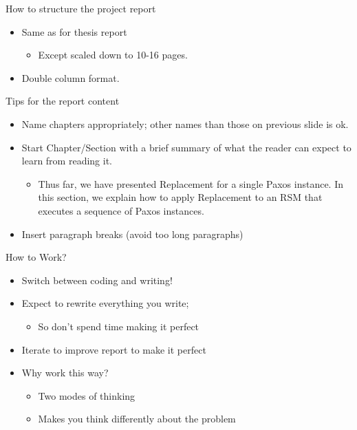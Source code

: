\documentclass[hyperref={pdfpagelabels=false}, aspectratio=1610]{beamer}
\begin{document}
\begin{frame}
\begin{block}{How to structure the project report}
 \begin{itemize}
	\item Same as for thesis report
	\begin{itemize}
		\item Except scaled down to 10-16 pages.
	\end{itemize}
	\item Double column format.
 \end{itemize}
\end{block}
\end{frame}


\begin{frame}
\begin{block}{Tips for the report content}
 \begin{itemize}
  \item Name chapters appropriately; other names than those on previous slide is ok.
  \item Start Chapter/Section with a brief summary of what the reader can expect to learn from reading it.
  \begin{itemize}
   \item Thus far, we have presented Replacement for a single Paxos instance. In this section, we explain how to apply Replacement to an RSM that executes a sequence of Paxos instances.
  \end{itemize}
  \item Insert paragraph breaks (avoid too long paragraphs)
 \end{itemize}
\end{block}
\end{frame}


\begin{frame}
\begin{block}{How to Work?}
 \begin{itemize}
  \item<2-> Switch between coding and writing!
  \item<3-> Expect to rewrite everything you write; 
  \begin{itemize}
  	\item<3-> So don't spend time making it perfect 
  \end{itemize}
  \item<4-> Iterate to improve report to make it perfect
  \item<5-> Why work this way?
  \begin{itemize}
	\item<6-> Two modes of thinking
  	\item<6-> Makes you think differently about the problem 
  \end{itemize}
 \end{itemize}
\end{block}
\end{frame}
\end{document}
